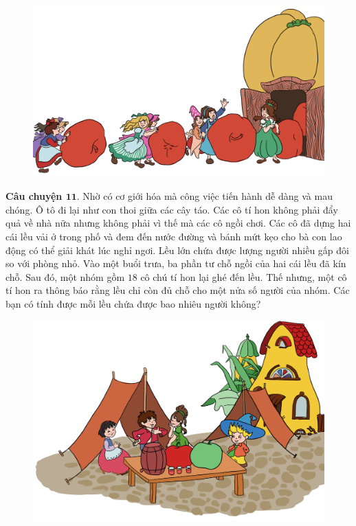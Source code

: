 	\begin{figure}[H]
		\centering
		\vspace*{-5pt}
		\captionsetup{labelformat= empty, justification=centering}
		\includegraphics[width=0.6\linewidth]{Hinh12_ChuyenTao}
		\vspace*{-10pt}
	\end{figure}
	\textbf{\color{toancuabi}Câu chuyện $\pmb{11.}$} Nhờ có cơ giới hóa mà công việc tiến hành dễ dàng và mau chóng. Ô tô đi lại như con thoi giữa các cây táo. Các cô tí hon không phải đẩy quả về nhà nữa nhưng không phải vì thế mà các cô ngồi chơi. Các cô đã dựng hai cái lều vải ở trong phố và đem đến nước đường và bánh mứt kẹo cho bà con lao động có thể giải khát lúc nghỉ ngơi. Lều lớn chứa được lượng người nhiều gấp đôi so với phòng nhỏ. Vào một buổi trưa, ba phần tư chỗ ngồi của hai cái lều đã kín chỗ. Sau đó, một nhóm gồm $18$ cô chú tí hon lại ghé đến lều. Thế nhưng, một cô tí hon ra thông báo rằng lều chỉ còn đủ chỗ cho một nửa số người của nhóm. Các bạn có tính được mỗi lều chứa được bao nhiêu người không?
		\begin{figure}[H]
		\centering
		\vspace*{-5pt}
		\captionsetup{labelformat= empty, justification=centering}
		\includegraphics[width=0.55\linewidth]{Hinh13_Leu}
		\vspace*{-10pt}
	\end{figure}
